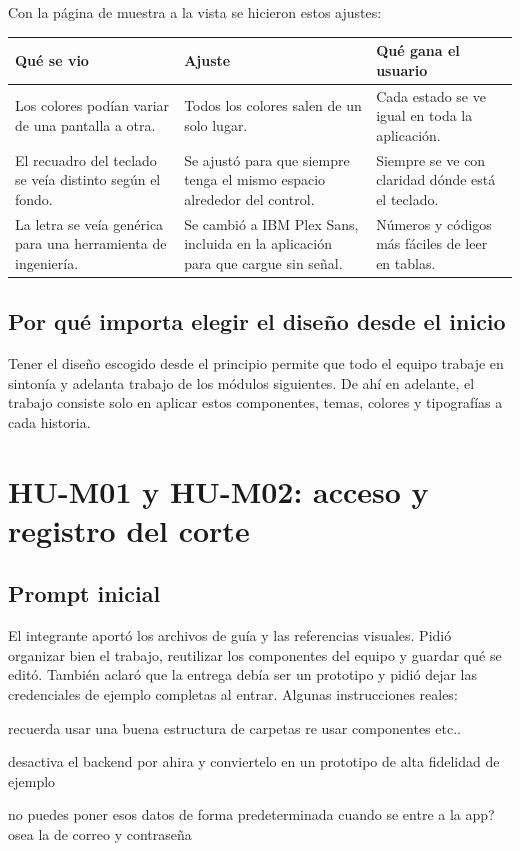 \documentclass[11pt]{article}
\newenvironment{ajustes}[3]
  {\small\begin{longtable}{>{\raggedright\arraybackslash}p{4.5cm} >{\raggedright\arraybackslash}p{4.4cm} >{\raggedright\arraybackslash}p{6.4cm}}
   \toprule \textbf{#1} & \textbf{#2} & \textbf{#3} \\ \midrule \endhead
   \bottomrule \endfoot}
  {\end{longtable}\normalsize}
\begin{document}
Con la página de muestra a la vista se hicieron estos ajustes:

\begin{ajustes}{Qué se vio}{Ajuste}{Qué gana el usuario}
Los colores podían variar de una pantalla a otra. & Todos los colores salen de un solo lugar. & Cada estado se ve igual en toda la aplicación. \\
El recuadro del teclado se veía distinto según el fondo. & Se ajustó para que siempre tenga el mismo espacio alrededor del control. & Siempre se ve con claridad dónde está el teclado. \\
La letra se veía genérica para una herramienta de ingeniería. & Se cambió a IBM Plex Sans, incluida en la aplicación para que cargue sin señal. & Números y códigos más fáciles de leer en tablas. \\
\end{ajustes}

\subsection{Por qué importa elegir el diseño desde el inicio}

Tener el diseño escogido desde el principio permite que todo el equipo trabaje
en sintonía y adelanta trabajo de los módulos siguientes. De ahí en adelante, el
trabajo consiste solo en aplicar estos componentes, temas, colores y tipografías
a cada historia.

\section{HU-M01 y HU-M02: acceso y registro del corte}\label{sec:hu01}


\subsection{Prompt inicial}

El integrante aportó los archivos de guía y las referencias visuales. Pidió organizar bien el trabajo, reutilizar los componentes del equipo y guardar qué se editó. También aclaró que la entrega debía ser un prototipo y pidió dejar las credenciales de ejemplo completas al entrar. Algunas instrucciones reales:

\begin{prompt}
recuerda usar una buena estructura de carpetas re usar componentes etc..
\end{prompt}
\begin{prompt}
desactiva el backend por ahira y conviertelo en un prototipo de alta fidelidad de ejemplo
\end{prompt}
\begin{prompt}
no puedes poner esos datos de forma predeterminada cuando se entre a la app? osea la de correo y contraseña
\end{prompt}
\end{document}
